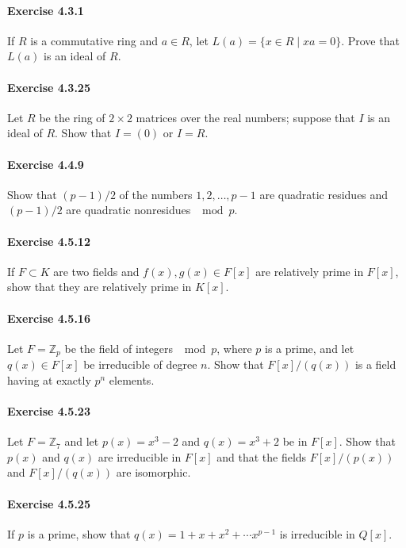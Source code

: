 \documentclass{article}
\begin{document}
\paragraph{Exercise 4.3.1} If $R$ is a commutative ring and $a \in R$, let $L(a) = \{x \in R \mid xa = 0\}$. Prove that $L(a)$ is an ideal of $R$.

\paragraph{Exercise 4.3.25} Let $R$ be the ring of $2 \times 2$ matrices over the real numbers; suppose that $I$ is an ideal of $R$. Show that $I = (0)$ or $I = R$.

\paragraph{Exercise 4.4.9} Show that $(p - 1)/2$ of the numbers $1, 2, \ldots, p - 1$ are quadratic residues and $(p - 1)/2$ are quadratic nonresidues $\mod p$.

\paragraph{Exercise 4.5.12} If $F \subset K$ are two fields and $f(x), g(x) \in F[x]$ are relatively prime in $F[x]$, show that they are relatively prime in $K[x]$.

\paragraph{Exercise 4.5.16} Let $F = \mathbb{Z}_p$ be the field of integers $\mod p$, where $p$ is a prime, and let $q(x) \in F[x]$ be irreducible of degree $n$. Show that $F[x]/(q(x))$ is a field having at exactly $p^n$ elements.

\paragraph{Exercise 4.5.23} Let $F = \mathbb{Z}_7$ and let $p(x) = x^3 - 2$ and $q(x) = x^3 + 2$ be in $F[x]$. Show that $p(x)$ and $q(x)$ are irreducible in $F[x]$ and that the fields $F[x]/(p(x))$ and $F[x]/(q(x))$ are isomorphic.

\paragraph{Exercise 4.5.25} If $p$ is a prime, show that $q(x) = 1 + x + x^2 + \cdots x^{p - 1}$ is irreducible in $Q[x]$.
\end{document}
